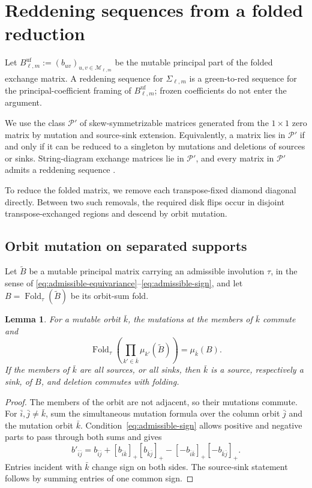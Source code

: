 \documentclass[11pt]{amsart}
\newtheorem{lemma}[theorem]{Lemma}
\theoremstyle{definition}
\theoremstyle{remark}
\begin{document}
\section{Reddening sequences from a folded reduction}
\label{sec:reddening}

Let
$B_{\ell,m}^{\mathrm{uf}} :=(b_{uv})_{u,v\in\mathscr M_{\ell,m}} $
be the mutable principal part of the folded exchange matrix.  A reddening
sequence for $\Sigma_{\ell,m}$ is a green-to-red sequence for the
principal-coefficient framing of $B_{\ell,m}^{\mathrm{uf}}$; frozen coefficients do not enter the argument.

We use the class $\mathscr P'$ of skew-symmetrizable matrices generated from
the $1\times1$ zero matrix by mutation and source-sink extension.  Equivalently,
a matrix lies in $\mathscr P'$ if and only if it can be reduced to a singleton
by mutations and deletions of sources or sinks.  String-diagram exchange
matrices lie in $\mathscr P'$, and every matrix in $\mathscr P'$ admits a
reddening sequence \cite[Theorem~4.8 and Corollary~4.9]{CaoString}.

To reduce the folded matrix, we remove each transpose-fixed diamond
diagonal directly.  Between two such removals, the required disk flips
occur in disjoint transpose-exchanged regions and descend by orbit mutation.

\subsection{Orbit mutation on separated supports}

Let $\widetilde B$ be a mutable principal matrix carrying an admissible
involution $\tau$, in the sense of
\eqref{eq:admissible-equivariance}--\eqref{eq:admissible-sign}, and let
$B=\operatorname{Fold}_{\tau}(\widetilde B)$ be its orbit-sum fold.

\begin{lemma}\label{lem:orbit-mutation-folding}
For a mutable orbit $\bar k$, the mutations at the members of $\bar k$
commute and
\[ \operatorname{Fold}_{\tau} \left(\prod_{k'\in\bar k}\mu_{k'}(\widetilde B)\right) =\mu_{\bar k}(B). \]
If the members of $\bar k$ are all sources, or all sinks, then $\bar k$ is
a source, respectively a sink, of $B$, and deletion commutes with folding.
\end{lemma}

\begin{proof}
The members of the orbit are not adjacent, so their mutations commute.  For
$\bar i,\bar j\ne\bar k$, sum the simultaneous mutation formula over the
column orbit $\bar j$ and the mutation orbit $\bar k$.  Condition~\eqref{eq:admissible-sign} allows positive and negative
parts to pass through both sums and gives
\[ b'_{\bar i\bar j} =b_{\bar i\bar j} +[b_{\bar i\bar k}]_+[b_{\bar k\bar j}]_+ -[-b_{\bar i\bar k}]_+[-b_{\bar k\bar j}]_+. \]
Entries incident with $\bar k$ change sign on both sides.  The source-sink
statement follows by summing entries of one common sign.
\end{proof}
\end{document}
